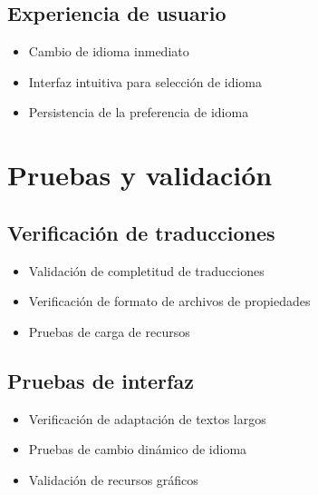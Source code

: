 \subsection{Experiencia de usuario}

\begin{itemize}
    \item Cambio de idioma inmediato
    \item Interfaz intuitiva para selección de idioma
    \item Persistencia de la preferencia de idioma
\end{itemize}

\section{Pruebas y validación}

\subsection{Verificación de traducciones}

\begin{itemize}
    \item Validación de completitud de traducciones
    \item Verificación de formato de archivos de propiedades
    \item Pruebas de carga de recursos
\end{itemize}

\subsection{Pruebas de interfaz}

\begin{itemize}
    \item Verificación de adaptación de textos largos
    \item Pruebas de cambio dinámico de idioma
    \item Validación de recursos gráficos
\end{itemize}

